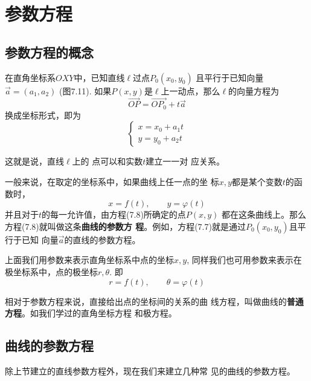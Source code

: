 \section{参数方程}

\subsection{参数方程的概念}
在直角坐标系$OXY$中，已知直线$\ell$过点$P_0(x_0,y_0)$
且平行于已知向量$\vec{a}=(a_1,a_2)$ (图7.11). 如果$P(x,
y)$是$\ell$上一动点，那么$\ell$的向量方程为
\[\Vec{OP}=\Vec{OP_0}+t\vec{a}\]
换成坐标形式，即为
\begin{equation}
    \begin{cases}
        x=x_0+a_1t\\
        y=y_0+a_2t
    \end{cases}
\end{equation}


\begin{figure}[htp]
    \centering
{}
    \caption{}
\end{figure}


这就是说，直线$\ell$上的
点可以和实数$t$建立一一对
应关系。

一般来说，在取定的坐标系中，如果曲线上任一点的坐
标$x,y$都是某个变数$t$的函数时，
\begin{equation}
    x=f(t),\qquad y=\varphi(t)
\end{equation}
并且对于$t$的每一允许值，由方程(7.8)所确定的点$P(x,y)$
都在这条曲线上。那么方程(7.8)就叫做这条\textbf{曲线的参数方
程}。例如，方程(7.7)就是通过$P_0(x_0,y_0)$且平行于已知
向量$\vec{a}$的直线的参数方程。

上面我们用参数来表示直角坐标系中点的坐标$x,y$, 
同样我们也可用参数来表示在极坐标系中，点的极坐标$r,
\theta$. 即
\[  r=f(t),\qquad \theta=\varphi(t)\]

相对于参数方程来说，直接给出点的坐标间的关系的曲
线方程，叫做曲线的\textbf{普通方程}。如我们学过的直角坐标方程
和极方程。

\subsection{曲线的参数方程}
除上节建立的直线参数方程外，现在我们来建立几种常
见的曲线的参数方程。

